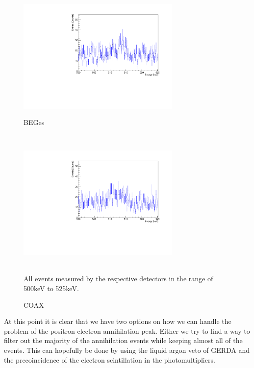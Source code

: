 \begin{figure}[t!]
\centering
\begin{minipage}{.5\textwidth}
  \centering
	\includegraphics[width=80mm]{./Bilder/500525NoFilterBEGes.pdf}
  \label{fig:NoFilterBEGes}
  \caption{BEGes}
\end{minipage}~
\begin{minipage}{.5\textwidth}
  \centering
	\includegraphics[width=80mm]{./Bilder/500525NoFilterCOAX.pdf}
  \caption{COAX}
  \label{fig:NoFilterCOAX}
\end{minipage}
    \\
	\vspace{0.5cm}
	All events measured by the respective detectors in the range of 500keV to 525keV.
\end{figure}

At this point it is clear that we have two options on how we can handle the problem of the positron electron annihilation peak. 
Either we try to find a way to filter out the majority of the annihilation events while keeping almost all of the  events.
This can hopefully be done by using the liquid argon veto of GERDA and the precoincidence of the electron scintillation in the photomultipliers. 
\\

